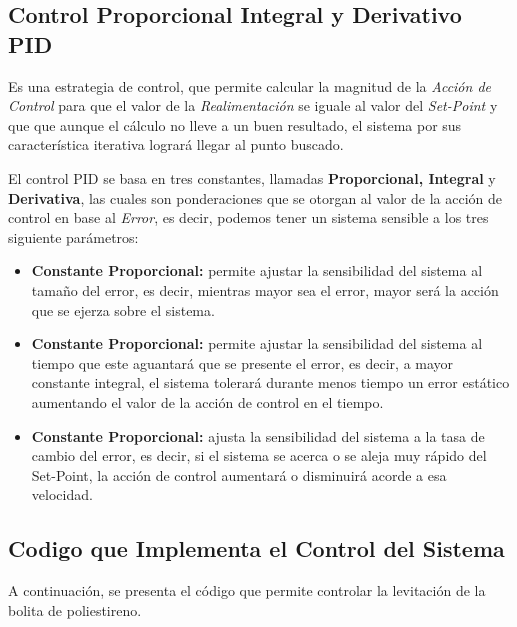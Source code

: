 \documentclass[letterpaper, 10pt]{report}
\begin{document}
\subsection{Control Proporcional Integral y Derivativo PID}

Es una estrategia de control, que permite calcular la magnitud de la \emph{Acción de Control} para que el valor de la \emph{Realimentación} se iguale al valor del \emph{Set-Point} y que que aunque el cálculo no lleve a un buen resultado, el sistema por sus característica iterativa logrará llegar al punto buscado.

El control PID se basa en tres constantes, llamadas \textbf{Proporcional, Integral} y \textbf{Derivativa}, las cuales son ponderaciones que se otorgan al valor de la acción de control en base al \emph{Error}, es decir, podemos tener un sistema sensible a los tres siguiente parámetros:

\begin{itemize}
	\item \textbf{Constante Proporcional: } permite ajustar la sensibilidad del sistema al tamaño del error, es decir, mientras mayor sea el error, mayor será la acción que se ejerza sobre el sistema.
	
	\item \textbf{Constante Proporcional: } permite ajustar la sensibilidad del sistema al tiempo que este aguantará que se presente el error, es decir, a mayor constante integral, el sistema tolerará durante menos tiempo un error estático aumentando el valor de la acción de control en el tiempo.
	
	\item \textbf{Constante Proporcional: } ajusta la sensibilidad del sistema a la tasa de cambio del error, es decir, si el sistema se acerca o se aleja muy rápido del Set-Point, la acción de control aumentará o disminuirá acorde a esa velocidad.
\end{itemize}

\subsection{Codigo que Implementa el Control del Sistema}

 A continuación, se presenta el código que permite controlar la levitación de la bolita de poliestireno.
 
\end{document}
